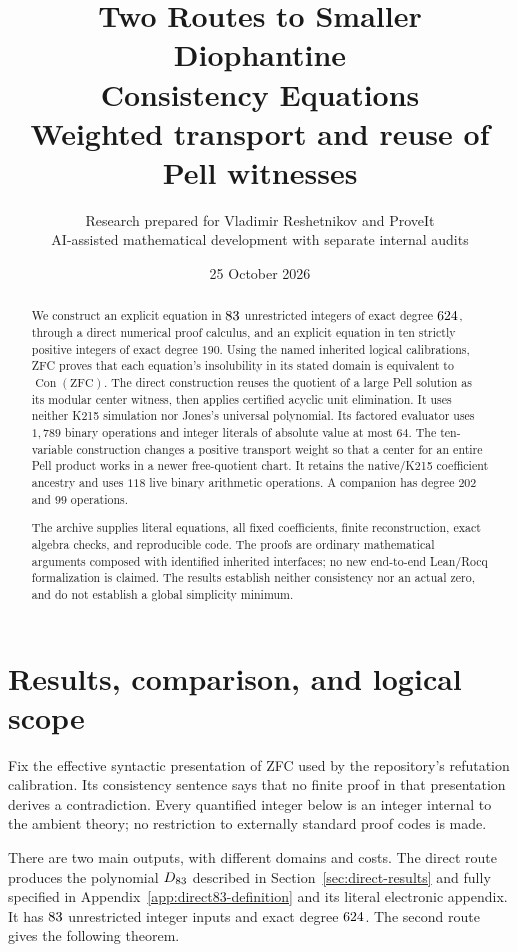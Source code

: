 \documentclass[11pt]{article}
\title{\textbf{Two Routes to Smaller Diophantine\\Consistency Equations}\\[6pt]
 \large Weighted transport and reuse of Pell witnesses}
\author{Research prepared for Vladimir Reshetnikov and ProveIt\\
 \small AI-assisted mathematical development with separate internal audits}
\date{25 October 2026}
\theoremstyle{remark}
\newcommand{\Con}{\operatorname{Con}}
\newcommand{\ZFC}{\mathrm{ZFC}}
\begin{document}
\maketitle

\begin{abstract}
We construct an explicit equation in \(83\) unrestricted
integers of exact degree \(624\), through a direct numerical
proof calculus, and an explicit equation in ten strictly positive integers
of exact degree \(190\). Using the named inherited logical calibrations,
ZFC proves that each equation's insolubility in its stated domain is
equivalent to \(\Con(\ZFC)\).
The direct construction reuses the quotient of a large Pell solution as
its modular center witness, then applies certified acyclic unit
elimination. It uses neither K215 simulation nor Jones's universal
polynomial. Its factored evaluator uses \(1{,}789\) binary operations
and integer literals of absolute value at most \(64\).
The ten-variable construction changes a positive transport
weight so that a center for an entire Pell product works in a newer
free-quotient chart. It retains the native/K215 coefficient ancestry and
uses \(118\) live binary arithmetic operations. A companion has degree
\(202\) and \(99\) operations.

The archive supplies literal equations, all fixed coefficients, finite
reconstruction, exact algebra checks, and reproducible code.
The proofs are ordinary mathematical arguments composed with identified
inherited interfaces; no new end-to-end Lean/Rocq formalization is claimed.
The results establish neither consistency nor an actual zero, and do
not establish a global simplicity minimum.
\end{abstract}
\clearpage
\tableofcontents
\newpage

\section{Results, comparison, and logical scope}

Fix the effective syntactic presentation of ZFC used by the repository's
refutation calibration. Its consistency sentence says that no finite proof
in that presentation derives a contradiction. Every quantified integer
below is an integer internal to the ambient theory; no restriction to
externally standard proof codes is made.

There are two main outputs, with different domains and costs.
The direct route produces the polynomial
\(D_{83}\) described in Section~\ref{sec:direct-results} and
fully specified in Appendix~\ref{app:direct83-definition} and its literal
electronic appendix. It has
\(83\) unrestricted integer inputs and exact degree
\(624\). The second route gives the following theorem.
\end{document}
